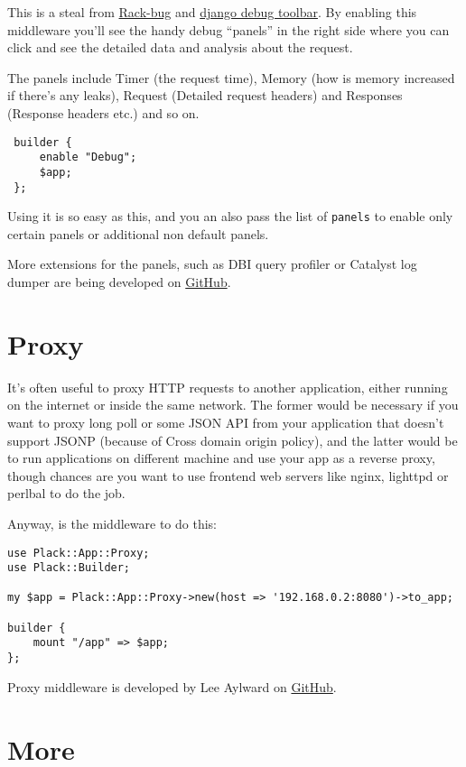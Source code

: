 This is a steal from \href{http://github.com/brynary/rack-bug}{Rack-bug}
and \href{http://github.com/robhudson/django-debug-toolbar}{django debug
toolbar}. By enabling this middleware you'll see the handy debug
``panels'' in the right side where you can click and see the detailed
data and analysis about the request.

The panels include Timer (the request time), Memory (how is memory
increased if there's any leaks), Request (Detailed request headers) and
Responses (Response headers etc.) and so on.

\begin{lstlisting}
 builder {
     enable "Debug";
     $app;
 };
\end{lstlisting}

Using it is so easy as this, and you an also pass the list of
\lstinline!panels! to enable only certain panels or additional non
default panels.

More extensions for the panels, such as DBI query profiler or Catalyst
log dumper are being developed on
\href{http://github.com/miyagawa/plack-middleware-debug/}{GitHub}.

\section{Proxy}\label{proxy}

It's often useful to proxy HTTP requests to another application, either
running on the internet or inside the same network. The former would be
necessary if you want to proxy long poll or some JSON API from your
application that doesn't support JSONP (because of Cross domain origin
policy), and the latter would be to run applications on different
machine and use your app as a reverse proxy, though chances are you want
to use frontend web servers like nginx, lighttpd or perlbal to do the
job.

Anyway,  is the middleware to do this:

\begin{lstlisting}
use Plack::App::Proxy;
use Plack::Builder;

my $app = Plack::App::Proxy->new(host => '192.168.0.2:8080')->to_app;

builder {
    mount "/app" => $app;
};
\end{lstlisting}

Proxy middleware is developed by Lee Aylward on
\href{http://github.com/leedo/Plack-App-Proxy}{GitHub}.

\section{More}\label{more}


